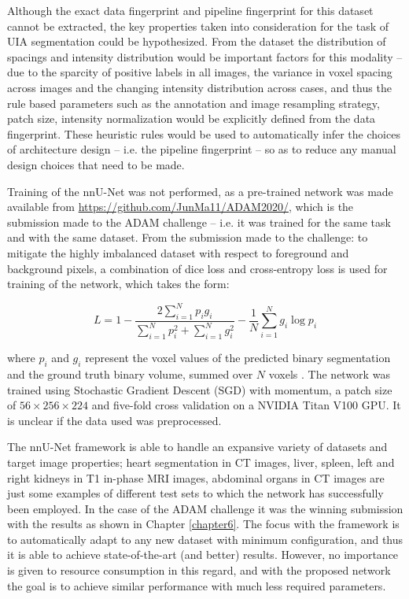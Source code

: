 Although the exact data fingerprint and pipeline fingerprint for this dataset cannot be extracted, the key properties taken into consideration for the task of UIA segmentation could be hypothesized. From the dataset the distribution of spacings and intensity distribution would be important factors for this modality -- due to the sparcity of positive labels in all images, the variance in voxel spacing across images and the changing intensity distribution across cases, and thus the rule based parameters such as the annotation and image resampling strategy, patch size, intensity normalization would be explicitly defined from the data fingerprint. These heuristic rules would be used to automatically infer the choices of architecture design -- i.e. the pipeline fingerprint -- so as to reduce any manual design choices that need to be made.

Training of the nnU-Net was not performed, as a pre-trained network was made available from \href{https://github.com/JunMa11/ADAM2020/}{https://github.com/JunMa11/ADAM2020/}, which is the submission made to the ADAM challenge -- i.e. it was trained for the same task and with the same dataset. From the submission made to the challenge: to mitigate the highly imbalanced dataset with respect to foreground and background pixels, a combination of dice loss and cross-entropy loss is used for training of the network, which takes the form:

\[L = 1 - \frac{2\sum_{i=1}^{N}p_{i}g_{i}}{\sum_{i=1}^{N}p_{i}^{2} + \sum_{i=1}^{N}g_{i}^{2}} - \frac{1}{N}\sum_{i=1}^{N}g_{i}\log p_{i}\]

where $p_{i}$ and $g_{i}$ represent the voxel values of the predicted binary segmentation and the ground truth binary volume, summed over $N$ voxels \cite{milletari2016v}. The network was trained using Stochastic Gradient Descent (SGD) with momentum, a patch size of $56 \times 256 \times 224$ and five-fold cross validation on a NVIDIA Titan V100 GPU. It is unclear if the data used was preprocessed. 

The nnU-Net framework is able to handle an expansive variety of datasets and target image properties; heart segmentation in CT images, liver, spleen, left and right kidneys in T1 in-phase MRI images, abdominal organs in CT images are just some examples of different test sets to which the network has successfully been employed. In the case of the ADAM challenge it was the winning submission with the results as shown in Chapter \ref{chapter6}. The focus with the framework is to automatically adapt to any new dataset with minimum configuration, and thus it is able to achieve state-of-the-art (and better) results. However, no importance is given to resource consumption in this regard, and with the proposed network the goal is to achieve similar performance with much less required parameters.


